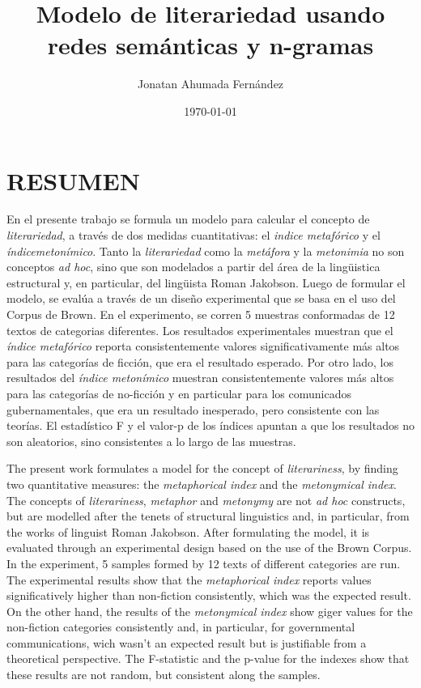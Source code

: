 \documentclass[12pt,letterpaper,twoside]{article}
\author{Jonatan Ahumada Fernández}
\date{\today}
\title{Modelo de literariedad usando redes semánticas y n-gramas}
\begin{document}
\maketitle
\tableofcontents

\doublespacing
\raggedright
\setlength{\parindent}{1.25cm}





\section{RESUMEN}
\label{sec:org7105f21}

 En el presente trabajo se formula un modelo para calcular el
concepto de \emph{literariedad}, a través de dos medidas
cuantitativas: el \emph{indice metafórico} y el \emph{índicemetonímico}.
Tanto la \emph{literariedad} como la \emph{metáfora} y
la \emph{metonimia} no son conceptos \emph{ad hoc}, sino que son
modelados a partir del área de la lingüistica estructural y, en
particular, del lingüista Roman Jakobson. Luego de formular el
modelo, se evalúa a través de un diseño experimental que se basa en
el uso del Corpus de Brown. En el experimento, se corren 5 muestras
conformadas de 12 textos de categorias diferentes. Los resultados
experimentales muestran que el \emph{índice metafórico} reporta
consistentemente valores significativamente más altos para las
categorías de ficción, que era el resultado esperado. Por otro
lado, los resultados del \emph{índice metonímico} muestran
consistentemente valores más altos para las categorías de
no-ficción y en particular para los comunicados gubernamentales,
que era un resultado inesperado, pero consistente con las
teorías. El estadístico F y el valor-p de los índices apuntan a que
los resultados no son aleatorios, sino consistentes a lo largo de
las muestras.



The present work formulates a model for the concept of
\emph{literariness}, by finding two quantitative measures: the
\emph{metaphorical index} and the \emph{metonymical index}.  The
concepts of \emph{literariness}, \emph{metaphor} and \emph{metonymy}
are not \emph{ad hoc} constructs, but are modelled after the tenets
of structural linguistics and, in particular, from the works of
linguist Roman Jakobson. After formulating the model, it is evaluated
through an experimental design based on the use of the Brown
Corpus. In the experiment, 5 samples formed by 12 texts of different
categories are run.  The experimental results show that the
\emph{metaphorical index} reports values significatively higher than
non-fiction consistently, which was the expected result. On the other
hand, the results of the \emph{metonymical index} show giger values
for the non-fiction categories consistently and, in particular, for
governmental communications, wich wasn't an expected result but is
justifiable from a theoretical perspective.  The F-statistic and the
p-value for the indexes show that these results are not random, but
consistent along the samples.  
\end{document}
